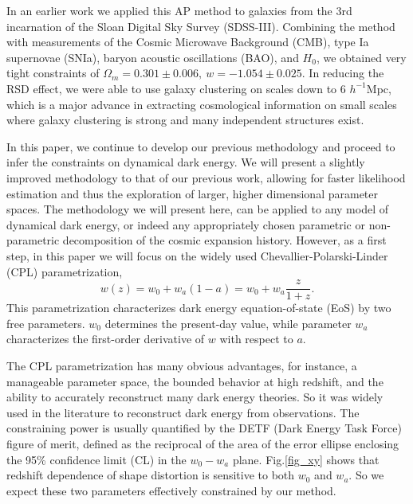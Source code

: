 \documentclass[prl,twocolumn,superscriptaddress,aps,amsmath,amssymb,nofootinbib,altaffilletter]{revtex4}
\begin{document}
In an earlier work\citep{Li2016} we applied this AP method to galaxies from the 3rd incarnation of the Sloan Digital Sky Survey (SDSS-III). 
Combining the method with measurements of the Cosmic Microwave Background (CMB), type Ia supernovae (SNIa), 
baryon acoustic oscillations (BAO), and $H_0$,
we obtained very tight constraints of $ \Omega_m = 0.301 \pm 0.006,\ w=-1.054 \pm 0.025$.
In reducing the RSD effect, 
we were able to use galaxy clustering on scales down to 6 $h^{-1}$Mpc,
which is a major advance in extracting cosmological information 
on small scales where galaxy clustering is strong and many independent structures exist.



In this paper, we continue to develop our previous methodology and proceed to infer the constraints on dynamical dark energy. 
We will present a slightly improved methodology to that of our previous work\citep{Li2016}, 
allowing for faster likelihood estimation and thus the exploration of larger, higher dimensional parameter spaces. 
The methodology we will present here, can be applied to any model of dynamical dark energy, 
or indeed any appropriately chosen parametric or non-parametric decomposition of the cosmic expansion history. 
However, as a first step, in this paper we will focus on the widely used Chevallier-Polarski-Linder (CPL) parametrization\cite{CPL_CP,CPL_L},
\begin{equation}
w(z) = w_0 + w_a (1-a) = w_0 + w_a \frac{z}{1+z}.
\end{equation}
This parametrization characterizes dark energy equation-of-state (EoS) by two free parameters.
$w_0$ determines the present-day value, while parameter $w_a$ characterizes the first-order derivative of $w$ with respect to $a$. 

The CPL parametrization has many obvious advantages, for instance, a manageable parameter space, 
the bounded behavior at high redshift, 
and the ability to accurately reconstruct many dark energy theories\cite{CPL_L}. 
So it was widely used in the literature to reconstruct dark energy from observations.
The constraining power is usually quantified by the DETF (Dark Energy Task Force) \cite{DETF} figure of merit, 
defined as the reciprocal of the area of the error ellipse enclosing the 95\% confidence limit (CL) in the $w_0-w_a$ plane. 
Fig.\ref{fig_xy} shows that redshift dependence of shape distortion is sensitive to both $w_0$ and $w_a$.
So we expect these two parameters effectively constrained by our method.
\end{document}

